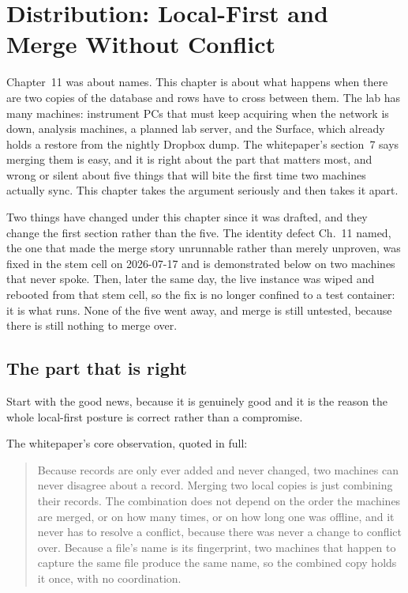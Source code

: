 \chapter{Distribution: Local-First and Merge Without Conflict}

Chapter~11 was about names. This chapter is about what happens when there are two copies of the database and rows have to cross between them. The lab has many machines: instrument PCs that must keep acquiring when the network is down, analysis machines, a planned lab server, and the Surface, which already holds a restore from the nightly Dropbox dump. The whitepaper's section~7 says merging them is easy, and it is right about the part that matters most, and wrong or silent about five things that will bite the first time two machines actually sync. This chapter takes the argument seriously and then takes it apart.

Two things have changed under this chapter since it was drafted, and they change the first section rather than the five. The identity defect Ch.~11 named, the one that made the merge story unrunnable rather than merely unproven, was fixed in the stem cell on 2026-07-17 and is demonstrated below on two machines that never spoke. Then, later the same day, the live instance was wiped and rebooted from that stem cell, so the fix is no longer confined to a test container: it is what runs. None of the five went away, and merge is still untested, because there is still nothing to merge over.

\section{The part that is right}

Start with the good news, because it is genuinely good and it is the reason the whole local-first posture is correct rather than a compromise.

The whitepaper's core observation, quoted in full:

\begin{quote}
Because records are only ever added and never changed, two machines can never disagree about a record. Merging two local copies is just combining their records. The combination does not depend on the order the machines are merged, or on how many times, or on how long one was offline, and it never has to resolve a conflict, because there was never a change to conflict over. Because a file's name is its fingerprint, two machines that happen to capture the same file produce the same name, so the combined copy holds it once, with no coordination.
\end{quote}

